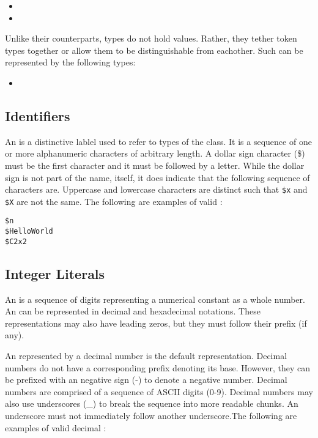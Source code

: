 \begin{itemize}
    \item {}
    \item {}
\end{itemize}

Unlike their counterparts,  types do not hold values. 
Rather, they tether  token types together or allow them to 
be distinguishable from eachother. Such  can be 
represented by the following types:

\begin{itemize}
    \item {}
\end{itemize}

\subsection{Identifiers}

An  is a distinctive lablel used to refer to 
 types of the  class. It is a 
sequence of one or more alphanumeric characters of arbitrary length. A dollar 
sign character (\$) must be the first character and it must be followed by a 
letter. While the dollar sign is not part of the  
name, itself, it does indicate that the following sequence of 
 characters are. Uppercase and lowercase characters are 
distinct such that \lstinline[language=grid]!$x! and 
\lstinline[language=grid]!$X! are not the same. The following are examples of 
valid :

\begin{lstlisting}[language=grid]
$n
$HelloWorld
$C2x2
\end{lstlisting}

\subsection{Integer Literals}

An  is a sequence of digits representing a 
numerical constant as a whole number. An  can 
be represented in decimal and hexadecimal notations. These 
representations may also have leading zeros, but they must follow their prefix 
(if any).

An  represented by a decimal number is the 
default representation. Decimal numbers do not have a corresponding prefix 
denoting its base. However, they can be prefixed with an negative sign (-) to 
denote a negative number. Decimal numbers are comprised of a sequence of ASCII 
digits (0-9). Decimal numbers may also use underscores (\_) to break the 
sequence into more readable chunks. An underscore must not immediately follow 
another underscore.The following are examples of valid decimal 
:

